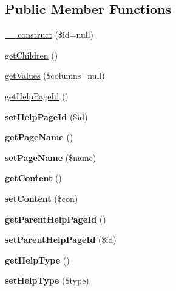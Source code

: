 \subsection*{Public Member Functions}
\begin{DoxyCompactItemize}
\item 
\hyperlink{classHelpPage_a46a830bfff2f6eb43d2dfe6475eb47af}{\_\-\_\-construct} (\$id=null)
\item 
\hyperlink{classHelpPage_a8c3a55add9c738d8cda1d7cf197fcb87}{getChildren} ()
\item 
\hyperlink{classHelpPage_ac4e71d65d287b8e0c1a48a298ccbcd01}{getValues} (\$columns=null)
\item 
\hyperlink{classHelpPage_a2550e4763c227585f61e019d693ffc68}{getHelpPageId} ()
\item 
\hypertarget{classHelpPage_a4df1fe50e1b81b27d9779917cdc51adc}{
{\bfseries setHelpPageId} (\$id)}
\label{classHelpPage_a4df1fe50e1b81b27d9779917cdc51adc}

\item 
\hypertarget{classHelpPage_a06af91cb569c267cdab83c41bb954b38}{
{\bfseries getPageName} ()}
\label{classHelpPage_a06af91cb569c267cdab83c41bb954b38}

\item 
\hypertarget{classHelpPage_a4db0edd1ad45e3ed7832307cdc331734}{
{\bfseries setPageName} (\$name)}
\label{classHelpPage_a4db0edd1ad45e3ed7832307cdc331734}

\item 
\hypertarget{classHelpPage_a99ca49dc399b4cd85429c3ac4fc249d4}{
{\bfseries getContent} ()}
\label{classHelpPage_a99ca49dc399b4cd85429c3ac4fc249d4}

\item 
\hypertarget{classHelpPage_a156f7f274c93755ffc04372a94d94292}{
{\bfseries setContent} (\$con)}
\label{classHelpPage_a156f7f274c93755ffc04372a94d94292}

\item 
\hypertarget{classHelpPage_aeb7c1692ee2cb9330d51f77b8a86e77d}{
{\bfseries getParentHelpPageId} ()}
\label{classHelpPage_aeb7c1692ee2cb9330d51f77b8a86e77d}

\item 
\hypertarget{classHelpPage_a18b643a638a283710d5eb9bc2cc4f3e7}{
{\bfseries setParentHelpPageId} (\$id)}
\label{classHelpPage_a18b643a638a283710d5eb9bc2cc4f3e7}

\item 
\hypertarget{classHelpPage_aefa9a91e16776417b74a5f7b52c0f6cd}{
{\bfseries getHelpType} ()}
\label{classHelpPage_aefa9a91e16776417b74a5f7b52c0f6cd}

\item 
\hypertarget{classHelpPage_a3a6404b1e1d1a544233160c78438aad9}{
{\bfseries setHelpType} (\$type)}
\label{classHelpPage_a3a6404b1e1d1a544233160c78438aad9}

\end{DoxyCompactItemize}
